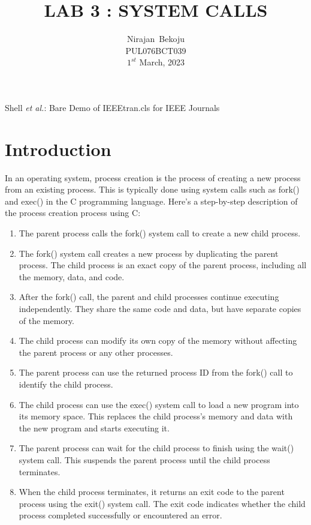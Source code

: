 \documentclass[journal,onecolumn]{IEEEtran}
\begin{document}
\title{LAB 3 : SYSTEM CALLS}

\author{Nirajan~Bekoju \\ PUL076BCT039 \\ $1^{st}$ March, 2023}

%
{Shell \MakeLowercase{\textit{et al.}}: Bare Demo of IEEEtran.cls for IEEE Journals}

\maketitle

\IEEEpeerreviewmaketitle

\section{Introduction}
In an operating system, process creation is the process of creating a new process from an existing process. This is typically done using system calls such as fork() and exec() in the C programming language. Here's a step-by-step description of the process creation process using C:

\begin{enumerate}
  \item The parent process calls the fork() system call to create a new child process.
  \item The fork() system call creates a new process by duplicating the parent process. The child process is an exact copy of the parent process, including all the memory, data, and code.
  \item After the fork() call, the parent and child processes continue executing independently. They share the same code and data, but have separate copies of the memory.
  \item The child process can modify its own copy of the memory without affecting the parent process or any other processes.
  \item The parent process can use the returned process ID from the fork() call to identify the child process.
  \item The child process can use the exec() system call to load a new program into its memory space. This replaces the child process's memory and data with the new program and starts executing it.
  \item The parent process can wait for the child process to finish using the wait() system call. This suspends the parent process until the child process terminates.
  \item When the child process terminates, it returns an exit code to the parent process using the exit() system call. The exit code indicates whether the child process completed successfully or encountered an error.

\end{enumerate}
\end{document}
